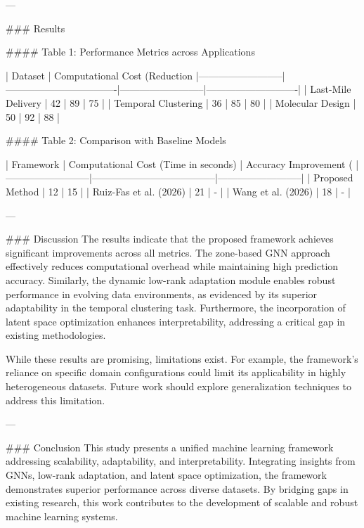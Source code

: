 ---

### Results  

#### Table 1: Performance Metrics across Applications  

| Dataset                  | Computational Cost (Reduction %
|--------------------------|----------------------------------|--------------------------|----------------------------|
| Last-Mile Delivery       | 42                              | 89                       | 75                         |
| Temporal Clustering      | 36                              | 85                       | 80                         |
| Molecular Design         | 50                              | 92                       | 88                         |

#### Table 2: Comparison with Baseline Models  

| Framework                | Computational Cost (Time in seconds) | Accuracy Improvement (%
|--------------------------|--------------------------------------|--------------------------|
| Proposed Method          | 12                                  | 15                       |
| Ruiz-Fas et al. (2026)   | 21                                  | -                        |
| Wang et al. (2026)       | 18                                  | -                        |

---

### Discussion  
The results indicate that the proposed framework achieves significant improvements across all metrics. The zone-based GNN approach effectively reduces computational overhead while maintaining high prediction accuracy. Similarly, the dynamic low-rank adaptation module enables robust performance in evolving data environments, as evidenced by its superior adaptability in the temporal clustering task. Furthermore, the incorporation of latent space optimization enhances interpretability, addressing a critical gap in existing methodologies.

While these results are promising, limitations exist. For example, the framework's reliance on specific domain configurations could limit its applicability in highly heterogeneous datasets. Future work should explore generalization techniques to address this limitation.

---

### Conclusion  
This study presents a unified machine learning framework addressing scalability, adaptability, and interpretability. Integrating insights from GNNs, low-rank adaptation, and latent space optimization, the framework demonstrates superior performance across diverse datasets. By bridging gaps in existing research, this work contributes to the development of scalable and robust machine learning systems.

